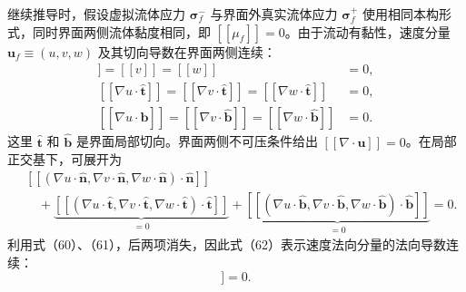 \documentclass[UTF8,11pt,a4paper]{ctexart}
\newcommand{\jump}[1]{[\![#1]\!]}
\begin{document}
继续推导时，假设虚拟流体应力 $\bm\sigma_f^{-}$ 与界面外真实流体应力 $\bm\sigma_f^{+}$ 使用相同本构形式，同时界面两侧流体黏度相同，即 $\jump{\mu_f}=0$。由于流动有黏性，速度分量 $\bm u_f\equiv(u,v,w)$ 及其切向导数在界面两侧连续：
\begin{align}
\jump{u}=\jump{v}=\jump{w}&=0, \tag{59}\\
\jump{\nabla u\cdot\hat{\bm t}}=
\jump{\nabla v\cdot\hat{\bm t}}=
\jump{\nabla w\cdot\hat{\bm t}}&=0, \tag{60}\\
\jump{\nabla u\cdot\hat{\bm b}}=
\jump{\nabla v\cdot\hat{\bm b}}=
\jump{\nabla w\cdot\hat{\bm b}}&=0. \tag{61}
\end{align}
这里 $\hat{\bm t}$ 和 $\hat{\bm b}$ 是界面局部切向。界面两侧不可压条件给出 $\jump{\nabla\cdot\bm u}=0$。在局部正交基下，可展开为
\begin{align}
&\jump{(\nabla u\cdot\hat{\bm n},\nabla v\cdot\hat{\bm n},\nabla w\cdot\hat{\bm n})\cdot\hat{\bm n}}\nonumber\\
&\quad+\underbrace{\jump{(\nabla u\cdot\hat{\bm t},\nabla v\cdot\hat{\bm t},\nabla w\cdot\hat{\bm t})\cdot\hat{\bm t}}}_{=0}
+\underbrace{\jump{(\nabla u\cdot\hat{\bm b},\nabla v\cdot\hat{\bm b},\nabla w\cdot\hat{\bm b})\cdot\hat{\bm b}}}_{=0}=0. \tag{62}
\end{align}
利用式（60）、（61），后两项消失，因此式（62）表示速度法向分量的法向导数连续：
\begin{equation}
\jump{\frac{\partial(\bm u_f\cdot\hat{\bm n})}{\partial n}}=0. \tag{63}
\end{equation}
\end{document}
